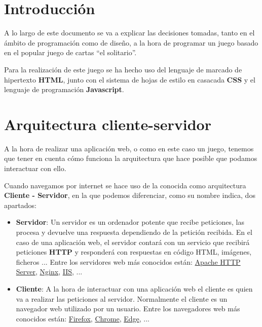 \documentclass{\ClassPath/viu-tfm-template}
\begin{document}
    \graphicspath{{../../VIU_TFM_LaTeX_template/}}

    \coverpage

    \tableofcontents

\chapter{Introducción}

A lo largo de este documento se va a explicar las decisiones tomadas, tanto en el ámbito de programación como de diseño, a la hora de programar un juego basado en el popular juego de cartas “el solitario”.

Para la realización de este juego se ha hecho uso del lenguaje de marcado de hipertexto \textbf{HTML}, junto con el sistema de hojas de estilo en casacada \textbf{CSS} y el lenguaje de programación \textbf{Javascript}.


\chapter{Arquitectura cliente-servidor}
A la hora de realizar una aplicación web, o como en este caso un juego, tenemos que tener en cuenta cómo funciona la arquitectura que hace posible que podamos interactuar con ello.

Cuando navegamos por internet se hace uso de la conocida como arquitectura \textbf{Cliente - Servidor}, en la que podemos diferenciar, como su nombre indica, dos apartados:

\begin{itemize}
    \item \textbf{Servidor}: Un servidor es un ordenador potente que recibe peticiones, las procesa y devuelve una respuesta dependiendo de la petición recibida. En el caso de una aplicación web, el servidor contará con un servicio que recibirá peticiones \textbf{HTTP} y responderá con respuestas en código HTML, imágenes, ficheros ... Entre los servidores web más conocidos están: \href{https://httpd.apache.org/}{Apache HTTP Server}, \href{https://nginx.org/}{Nginx}, \href{https://www.iis.net/}{IIS}, ...

    \item \textbf{Cliente}: A la hora de interactuar con una aplicación web el cliente es quien va a realizar las peticiones al servidor. Normalmente el cliente es un navegador web utilizado por un usuario. Entre los navegadores web más conocidos están: \href{https://www.mozilla.org/es-ES/firefox/}{Firefox}, \href{https://www.google.com/chrome/}{Chrome}, \href{https://www.microsoft.com/es-es/edge}{Edge}, ...
\end{itemize}
\end{document}
